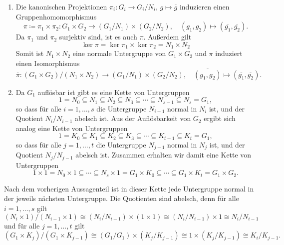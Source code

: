 \begin{solution}
  \begin{enumerate}
    \item
      Die kanonischen Projektionen $\pi_i \colon G_i \to G_i/N_i$, $g \mapsto \overline{g}$ induzieren einen Gruppenhomomorphismus
      \[
        \pi
        \coloneqq
                \pi_1 \times \pi_2
        \colon  G_1 \times G_2
        \to     (G_1/N_1) \times (G_2/N_2),
        \quad
                (g_1, g_2)
        \mapsto (\overline{g_1}, \overline{g_2}).
      \]
      Da $\pi_1$ und $\pi_2$ surjektiv sind, ist es auch $\pi$.
      Außerdem gilt
      \[
          \ker \pi
        = \ker \pi_1 \times \ker \pi_2
        = N_1 \times N_2
      \]
      Somit ist $N_1 \times N_2$ eine normale Untergruppe von $G_1 \times G_2$ und $\pi$ induziert einen Isomorphismus
      \[
                \overline{\pi}
        \colon  (G_1 \times G_2)/(N_1 \times N_2)
        \to     (G_1/N_1) \times (G_2/N_2),
        \quad
                \overline{(g_1, g_2)}
        \mapsto (\overline{g_1}, \overline{g_2}).
      \]
      
    \item
      Da $G_1$ auflösbar ist gibt es eine Kette von Untergruppen
      \[
                  1
        =         N_0
        \subseteq N_1
        \subseteq N_2
        \subseteq N_3
        \subseteq \dotsb
        \subseteq N_{s-1}
        \subseteq N_s
        =         G_1,
      \]
      so dass für alle $i = 1, \dotsc, s$ die Untergruppe $N_{i-1}$ normal in $N_i$ ist, und der Quotient $N_i/N_{i-1}$ abelsch ist.
      Aus der Auflösbarkeit von $G_2$ ergibt sich analog eine Kette von Untergruppen
      \[
                  1
        =         K_0
        \subseteq K_1
        \subseteq K_2
        \subseteq K_3
        \subseteq \dotsb
        \subseteq K_{t-1}
        \subseteq K_t
        =         G_1,
      \]
      so dass für alle $j = 1, \dotsc, t$ die Untergruppe $N_{j-1}$ normal in $N_j$ ist, und der Quotient $N_j/N_{j-1}$ abelsch ist.
      Zusammen erhalten wir damit eine Kette von Untergruppen
      \[
                  1       \times 1
        =         N_0     \times 1
        \subseteq \dotsb
        \subseteq N_s     \times 1
        =         G_1     \times K_0
        \subseteq \dotsb
        \subseteq G_1     \times K_t
        =         G_1     \times G_2.
      \]
  \end{enumerate}
  Nach dem vorherigen Aussagenteil ist in dieser Kette jede Untergruppe normal in der jeweils nächsten Untergruppe.
  Die Quotienten sind abelsch, denn für alle $i = 1, \dotsc, s$ gilt
  \[
          (N_i \times 1)/(N_{i-1} \times 1)
    \cong (N_i/N_{i-1}) \times (1 \times 1)
    \cong (N_i/N_{i-1}) \times 1
    \cong N_i/N_{i-1}
  \]
  und für alle $j = 1, \dotsc, t$ gilt
  \[
          (G_1 \times K_j)/(G_1 \times K_{j-1})
    \cong (G_1/G_1) \times (K_j/K_{j-1})
    \cong 1 \times (K_j/K_{j-1})
    \cong K_i/K_{j-1}.
  \]
\end{solution}


